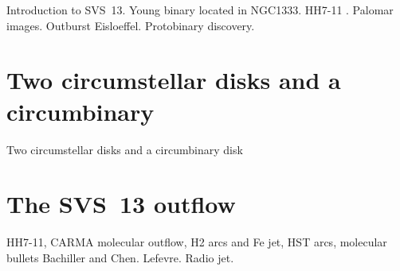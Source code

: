 \documentclass[12pt]{mythesis}
\begin{document}
% 
% 
% 
% 
Introduction to SVS~13. Young binary located in NGC1333. HH7-11 \citep{hartigan2019}. Palomar images. Outburst Eisloeffel. Protobinary discovery. 

\section{Two circumstellar disks and a circumbinary}
Two circumstellar disks and a circumbinary disk \citep{diaz-rodriguez2022} \citep{diaz-rodriguezphd}

\section{The SVS~13 outflow}
HH7-11, CARMA molecular outflow, H2 arcs and Fe jet, HST arcs, molecular bullets Bachiller and Chen. Lefevre. Radio jet.
\end{document}
